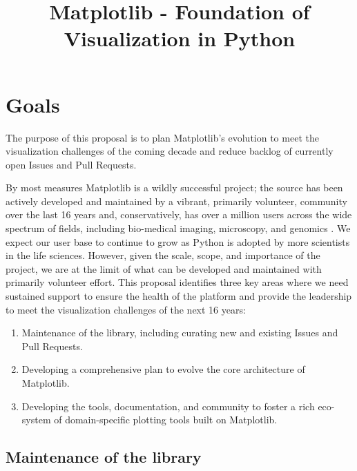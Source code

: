\documentclass[11pt]{article}  %
\begin{document}
\title{Matplotlib - Foundation of Visualization in Python}
\author{}
\maketitle

\section{Goals}

The purpose of this proposal is to plan Matplotlib's evolution to meet
the visualization challenges of the coming decade and reduce backlog
of currently open Issues and Pull Requests.

By most measures Matplotlib is a wildly successful project; the source
has been actively developed and maintained by a vibrant, primarily
volunteer, community over the last 16 years and, conservatively, has
over a million users across the wide spectrum of fields, including
bio-medical imaging, microscopy, and genomics
\cite{Carpenter2006,Wolf2018,10.7717/peerj.453}
\cite{Segata2011,10.1371/journal.pgen.1000695,HASHIMSHONY2012666,
  10.1093/bioinformatics/bts480,Carlile2014,Laganowsky2014,Jiangaac9462,
  10.3389/fninf.2014.00014}.  We expect our user base to continue to
grow as Python is adopted by more scientists in the life sciences.
However, given the scale, scope, and importance of the project, we are
at the limit of what can be developed and maintained with primarily
volunteer effort.  This proposal identifies three key areas where we
need sustained support to ensure the health of the platform and
provide the leadership to meet the visualization challenges of the
next 16 years:

\begin{enumerate}[label=\alph*)]
  \item Maintenance of the library, including curating new and
    existing Issues and Pull Requests.
  \item Developing a comprehensive plan to evolve the core architecture
    of Matplotlib.
  \item Developing the tools, documentation, and community to foster a
    rich eco-system of domain-specific plotting tools built on
    Matplotlib.
\end{enumerate}


\subsection{Maintenance of the library}
\end{document}
